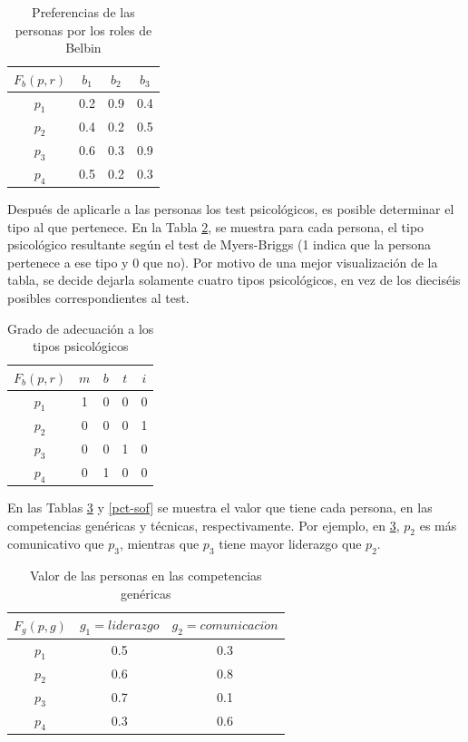 \begin{table}[H]
  \centering
  \caption{Preferencias de las personas por los roles de Belbin}\label{prb-sof}
\begin{tabular}{|c|c|c|c|}
	\hline
	$F_b(p,r)$ & $b_1$ & $b_2$ & $b_3$ \\ \hline
	  $p_1$    &  0.2  &  0.9  &  0.4  \\ \hline
	  $p_2$    &  0.4  &  0.2  &  0.5  \\ \hline
	  $p_3$    &  0.6  &  0.3  &  0.9  \\ \hline
	  $p_4$    &  0.5  &  0.2  &  0.3  \\ \hline
\end{tabular}
\end{table}



Después de aplicarle a las personas los test psicológicos, es posible determinar el tipo al que pertenece. En la Tabla \ref{prps-sof}, se muestra para cada persona, el tipo psicológico resultante según el test de Myers-Briggs (1 indica que la persona pertenece a ese tipo y 0 que no). Por motivo de una mejor visualización de la tabla, se decide dejarla solamente cuatro tipos psicológicos, en vez de los dieciséis posibles correspondientes al test.
\begin{table}[H]
  \centering
  \caption{Grado de adecuación a los tipos psicológicos}\label{prps-sof}
\begin{tabular}{|c|c|c|c|c|}
	\hline
	$F_b(p,r)$ & $m$ & $b$ & $t$ & $i$ \\ \hline
	  $p_1$    &  1  &  0  &  0  &  0  \\ \hline
	  $p_2$    &  0  &  0  &  0  &  1  \\ \hline
	  $p_3$    &  0  &  0  &  1  &  0  \\ \hline
	  $p_4$    &  0  &  1  &  0  &  0  \\ \hline
\end{tabular}
\end{table}


En las Tablas \ref{pcg-sof} y \ref{pct-sof} se muestra el valor que tiene cada persona, en las competencias genéricas y técnicas, respectivamente. Por ejemplo, en \ref{pcg-sof}, $p_2$ es más comunicativo que $p_3$, mientras que $p_3$ tiene mayor liderazgo que $p_2$.


\begin{table}[H]
	\centering
	\caption{Valor de las personas en las competencias genéricas}\label{pcg-sof}
	\begin{tabular}{|c|c|c|}
		\hline
		$F_g(p,g)$ & $g_1=liderazgo$ & $g_2=comunicaci\acute{o}n$ \\ \hline
		  $p_1$    &       0.5       &            0.3             \\ \hline
		  $p_2$    &       0.6       &            0.8             \\ \hline
		  $p_3$    &       0.7       &            0.1             \\ \hline
		  $p_4$    &       0.3       &            0.6             \\ \hline
	\end{tabular}
\end{table}

